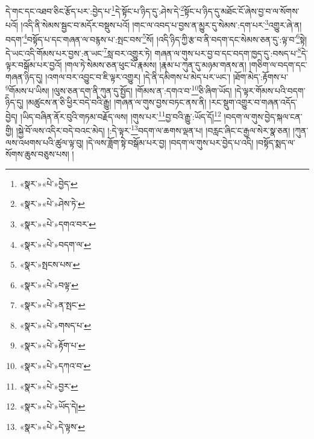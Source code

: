 དེ་གང་དང་འཐབ་ཅིང་རྩོད་པར་:བྱེད་པ་\footnote{«སྣར་»«པེ་»བྱེད་}དེ་སྟོང་པ་ཉིད་དུ་:ཤེས་དེ་\footnote{«སྣར་»«པེ་»ཤེས་ཏེ་}སྟོང་པ་ཉིད་དུ་མཐོང་ངོ་ཞེས་བྱ་བ་ལ་སོགས་པའོ། །འདི་ནི་སེམས་སྦྱང་བ་མདོར་བསྡུས་པའོ། །གང་ལ་འབད་པ་བྱས་ན་མྱུར་དུ་སེམས་:དག་པར་\footnote{«སྣར་»«པེ་»དགའ་བར་}འགྱུར་ཞེ་ན། བདག་\footnote{«སྣར་»«པེ་»བདག་ལ་}བསྟོད་པ་དང་གཞན་ལ་བརྙས་པ་:སྤང་བས་\footnote{«སྣར་»སྤངས་པས་}སོ། །འདི་ཉིད་ཀྱི་རྩ་བ་ནི་བདག་དང་སེམས་ཅན་དུ་:ལྟ་བ་\footnote{«སྣར་»«པེ་»བལྟ་}སྟེ། དེ་ཡང་འདི་གོམས་པར་བྱས་:ན་ཡང་\footnote{«སྣར་»«པེ་»ན་སྤང་}སླ་བར་འགྱུར་ཏེ། གཞན་ལ་གུས་པར་བྱ་བ་དང་བདག་ཁྱད་དུ་:བསད་པ་\footnote{«སྣར་»«པེ་»གསད་པ་}དེ་ལྟར་བསྒོམ་པར་བྱའོ། །གལ་ཏེ་སེམས་ཅན་ཕུང་པོ་རྣམས། །རྣམ་པ་ཀུན་དུ་མཉམ་གནས་ན། །གཅིག་ལ་བདག་དང་གཞན་ཉིད་དུ། །འགལ་བར་འབྱུང་བ་ཇི་ལྟར་འགྱུར། །དེ་ནི་དམིགས་པ་མེད་པར་ཡང་། །ཐོག་མེད་:རྟོགས་པ་\footnote{«སྣར་»«པེ་»རྟོག་པ་}གོམས་པ་ཡིས། །ལུས་ཅན་དག་ནི་ཀུན་དུ་སྤྱོད། །གོམས་ན་:དགའ་བ་\footnote{«སྣར་»«པེ་»དཀའ་བ་}ཅི་ཞིག་ཡོད། །དེ་ལྟར་གོམས་པའི་བདག་ཉིད་དུ། །མཚུངས་ན་ཅི་ཕྱིར་བདེ་བའི་རྒྱུ། །གཞན་ལ་གུས་བྱས་བཏང་ནས་ནི། །རང་སྡུག་འགྱུར་བ་གཞན་འདོད་བྱེད། །ཡིད་བཞིན་ནོར་བུའི་གཏམ་བརྗོད་ལས། །གུས་པར་\footnote{«སྣར་»«པེ་»བྱར་}བྱ་བའི་རྒྱུ་:ཡོད་དོ།\footnote{«སྣར་»«པེ་»ཡོད་དེ།} །བདག་ལ་གུས་བྱེད་སྐལ་ངན་གྱི། །སྐྱེ་བོ་ལས་འདིར་བདེ་བའང་མེད། །:དེ་ལྟར་\footnote{«སྣར་»«པེ་»དེ་ལྟས་}བདག་ལ་ཆགས་ལྡན་པ། །བརླང་ཞིང་ང་རྒྱལ་སེར་སྣ་ཅན། །ཀུན་ལས་འཕགས་པའི་ཚུལ་ལྟ་བུ། །དེ་ལས་ཟློག་སྟེ་བསྒོམ་པར་བྱ། །བདག་ལ་གུས་པར་བྱེད་པ་འདི། །བསྟོད་སྨད་ལ་སོགས་ཆུས་བཅུས་པས། །
